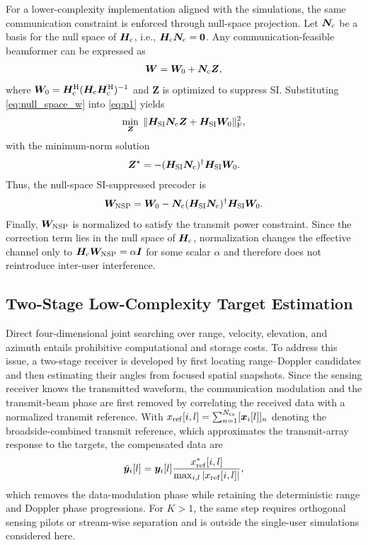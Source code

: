 \documentclass[conference]{IEEEtran}
\begin{document}
For a lower-complexity implementation aligned with the simulations, the same communication constraint is enforced through null-space projection. Let $\bm{N}_{\rm c}$ be a basis for the null space of $\bm{H}_{\rm c}$, i.e., $\bm{H}_{\rm c}\bm{N}_{\rm c}=\bm{0}$. Any communication-feasible beamformer can be expressed as
\begin{align}
    \bm{W}=\bm{W}_{0}+\bm{N}_{\rm c}\bm{Z},
    \label{eq:null_space_w}
\end{align}
where $\bm{W}_{0}=\bm{H}_{\rm c}^{\rm H}(\bm{H}_{\rm c}\bm{H}_{\rm c}^{\rm H})^{-1}$ and $\bm{Z}$ is optimized to suppress SI. Substituting \eqref{eq:null_space_w} into \eqref{eq:p1} yields
\begin{align}
    \min_{\bm{Z}}\;\|\bm{H}_{\rm SI}\bm{N}_{\rm c}\bm{Z}+\bm{H}_{\rm SI}\bm{W}_0\|_{\rm F}^2,
    \label{eq:null_ls}
\end{align}
with the minimum-norm solution
\begin{align}
    \bm{Z}^{\star}=-(\bm{H}_{\rm SI}\bm{N}_{\rm c})^{\dagger}\bm{H}_{\rm SI}\bm{W}_0.
    \label{eq:z_solution}
\end{align}
Thus, the null-space SI-suppressed precoder is
\begin{align}
    \bm{W}_{\rm NSP}=\bm{W}_{0}-\bm{N}_{\rm c}(\bm{H}_{\rm SI}\bm{N}_{\rm c})^{\dagger}\bm{H}_{\rm SI}\bm{W}_0.
    \label{eq:nsp}
\end{align}
Finally, $\bm{W}_{\rm NSP}$ is normalized to satisfy the transmit power constraint. Since the correction term lies in the null space of $\bm{H}_{\rm c}$, normalization changes the effective channel only to $\bm{H}_{\rm c}\bm{W}_{\rm NSP}=\alpha\bm{I}$ for some scalar $\alpha$ and therefore does not reintroduce inter-user interference.

\subsection{Two-Stage Low-Complexity Target Estimation}
Direct four-dimensional joint searching over range, velocity, elevation, and azimuth entails prohibitive computational and storage costs. To address this issue, a two-stage receiver is developed by first locating range--Doppler candidates and then estimating their angles from focused spatial snapshots. Since the sensing receiver knows the transmitted waveform, the communication modulation and the transmit-beam phase are first removed by correlating the received data with a normalized transmit reference. With $x_{\rm ref}[i,l]=\sum_{n=1}^{N_{\rm tx}}[\bm{x}_i[l]]_n$ denoting the broadside-combined transmit reference, which approximates the transmit-array response to the targets, the compensated data are
\begin{align}
    \bar{\bm{y}}_i[l]=
    \bm{y}_{i}[l]\frac{x_{\rm ref}^{*}[i,l]}{\max_{i,l}|x_{\rm ref}[i,l]|},
    \label{eq:symbol_comp}
\end{align}
which removes the data-modulation phase while retaining the deterministic range and Doppler phase progressions. For $K>1$, the same step requires orthogonal sensing pilots or stream-wise separation and is outside the single-user simulations considered here.
\end{document}
